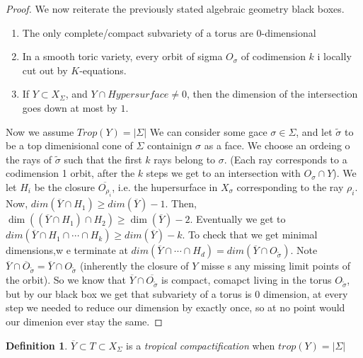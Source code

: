 \documentclass[11pt]{article}
\theoremstyle{definition}
\theoremstyle{plain}%
\theoremstyle{definition}
\newtheorem{protodefinition}{Definition}[section]
\newenvironment{defn}
   {\colorlet{shadecolor}{black!15}\begin{shaded}\begin{protodefinition}}
   {\end{protodefinition}\end{shaded}}
\begin{document}
\begin{proof}
    



 


    We now reiterate the previously stated algebraic geometry black boxes.
    \begin{enumerate}
        \item The only complete/compact subvariety of a torus are 0-dimensional
        \item In a smooth toric variety, every orbit of sigma $O_\sigma$ of codimension $k$ i locally cut out by $K$-equations.
        \item If $Y \subset X_\Sigma$, and $Y \cap Hypersurface \neq 0$, then the dimension of the intersection goes down at most by $1$.
    \end{enumerate}

Now we assume $Trop(Y)=|\Sigma|$   We can consider some gace $\sigma\in \Sigma$, and let $\tilde{\sigma}$ to be a top dimenisional cone of $\Sigma$ containign $\sigma$ as a face. We choose an ordeing o the rays of $\tilde{\sigma}$ such that the first $k$ rays belong to $\sigma$. (Each ray corresponds to a codimension 1 orbit, after the $k$ steps we get to an intersection with $O_\sigma \cap Y$). We let $H_i$ be the closure $\overline{O_{\rho_i}}$, i.e. the hupersurface in $X _\sigma$ corresponding to the ray $\rho_i$. Now, $dim(\overline{Y} \cap H_1) \geq dim(\overline{Y}) -1$. Then, $\dim ((\overline{Y} \cap H_1)\cap H_2) \geq \dim(\overline{Y})-2$. Eventually we get to $dim(\overline{Y} \cap H_1 \cap \cdots \cap H_k) \geq dim(\overline{Y})-k$. To check that we get minimal dimensions,w e terminate at $dim(\overline{Y} \cap \cdots \cap H_d) = dim(\overline{Y} \cap O_{\tilde{\sigma}})$. Note $\overline{Y} \cap \overline{O}_{\tilde{\sigma}} = \overline{Y} \cap O_{\tilde{\sigma}}$ (inherently the closure of $Y$ misse s any missing limit points of the orbit). So we know that $\overline{Y} \cap \overline{O_{\tilde{\sigma}}}$ is compact, comapct living in the torus $O_{\tilde{\sigma}}$, but by our black box we get that subvariety of a torus is 0 dimension, at every step we needed to reduce our dimension by exactly once, so at no point would our dimenion ever stay the same.




\end{proof}

\begin{defn}
$\overline{Y} \subset T \subset X_\Sigma$ is a \emph{tropical compactification} when $trop(Y) = |\Sigma|$
\end{defn}
\end{document}
